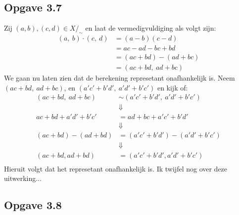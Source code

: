 \documentclass{article}
\newcommand{\q}{/_\sim}
\begin{document}
\subsection*{Opgave 3.7}
Zij $(a, b), (c, d) \in X\q$ en laat de vermedigvuldiging als volgt zijn:
\begin{align*}
	(a, \ b)\cdot(c, \ d) &= (a-b)(c-d) \\
	&= ac - ad - bc + bd \\
	&= (ac + bd) - (ad + bc) \\
	&= (ac + bd, \ ad + bc)
\end{align*}
We gaan nu laten zien dat de berekening represetant onafhankelijk is.
Neem $(ac + bd, \ ad + bc)$, en $(a'c' + b'd', \ a'd'+b'c')$ en kijk of:
\begin{align*}
(ac + bd, \ ad + bc) &\sim (a'c' + b'd', \ a'd' + b'c') \\
&\Downarrow \\ 
ac + bd + a'd' + b'c' &= ad + bc + a'c' + b'd' \\
&\Downarrow \\
(ac + bd) - (ad + bd) &= (a'c' + b'd') - (a'd' + b'c') \\
&\Downarrow \\
(ac + bd, ad + bd) &= (a'c' + b'd', a'd' + b'c') \\
\end{align*}
Hieruit volgt dat het represetant onafhankelijk is. Ik twijfel nog over deze uitwerking...

\subsection*{Opgave 3.8}
\end{document}
